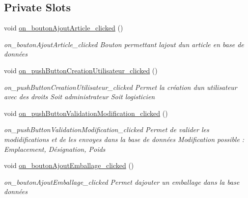 \subsection*{Private Slots}
\begin{DoxyCompactItemize}
\item 
\mbox{\label{class_main_window_abad6799f81cc7f64285e9536602587d4}} 
void \mbox{\hyperlink{class_main_window_abad6799f81cc7f64285e9536602587d4}{on\+\_\+bouton\+Ajout\+Article\+\_\+clicked}} ()
\begin{DoxyCompactList}\small\item\em on\+\_\+bouton\+Ajout\+Article\+\_\+clicked Bouton permettant l\textquotesingle{}ajout d\textquotesingle{}un article en base de données \end{DoxyCompactList}\item 
\mbox{\label{class_main_window_aadd36eb49a354cb717cb7adfe99551a1}} 
void \mbox{\hyperlink{class_main_window_aadd36eb49a354cb717cb7adfe99551a1}{on\+\_\+push\+Button\+Creation\+Utilisateur\+\_\+clicked}} ()
\begin{DoxyCompactList}\small\item\em on\+\_\+push\+Button\+Creation\+Utilisateur\+\_\+clicked Permet la création d\textquotesingle{}un utilisateur avec des droits Soit administrateur Soit logisticien \end{DoxyCompactList}\item 
\mbox{\label{class_main_window_a52e694f16838cbd270e9ffb9e1a042f8}} 
void \mbox{\hyperlink{class_main_window_a52e694f16838cbd270e9ffb9e1a042f8}{on\+\_\+push\+Button\+Validation\+Modification\+\_\+clicked}} ()
\begin{DoxyCompactList}\small\item\em on\+\_\+push\+Button\+Validation\+Modification\+\_\+clicked Permet de valider les modidifications et de les envoyes dans la base de données Modification possible \+: Emplacement, Désignation, Poids \end{DoxyCompactList}\item 
\mbox{\label{class_main_window_a5f1afed7f100f21648663d205ded5af9}} 
void \mbox{\hyperlink{class_main_window_a5f1afed7f100f21648663d205ded5af9}{on\+\_\+bouton\+Ajout\+Emballage\+\_\+clicked}} ()
\begin{DoxyCompactList}\small\item\em on\+\_\+bouton\+Ajout\+Emballage\+\_\+clicked Permet d\textquotesingle{}ajouter un emballage dans la base données \end{DoxyCompactList}\item 

\end{DoxyCompactItemize}
